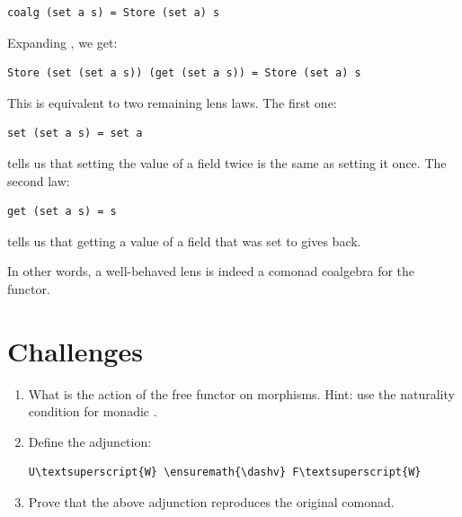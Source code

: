 \begin{verbatim}
coalg (set a s) = Store (set a) s
\end{verbatim}
Expanding , we get:

\begin{verbatim}
Store (set (set a s)) (get (set a s)) = Store (set a) s
\end{verbatim}
This is equivalent to two remaining lens laws. The first one:

\begin{verbatim}
set (set a s) = set a
\end{verbatim}
tells us that setting the value of a field twice is the same as setting
it once. The second law:

\begin{verbatim}
get (set a s) = s
\end{verbatim}
tells us that getting a value of a field that was set to 
gives  back.

In other words, a well-behaved lens is indeed a comonad coalgebra for
the  functor.

\section{Challenges}\label{challenges}

\begin{enumerate}
\tightlist
\item
  What is the action of the free functor
   on morphisms. Hint: use the
  naturality condition for monadic .
\item
  Define the adjunction:

  \begin{Verbatim}[commandchars=\\\{\}]
U\textsuperscript{W} \ensuremath{\dashv} F\textsuperscript{W}
\end{Verbatim}
\item
  Prove that the above adjunction reproduces the original comonad.
\end{enumerate}